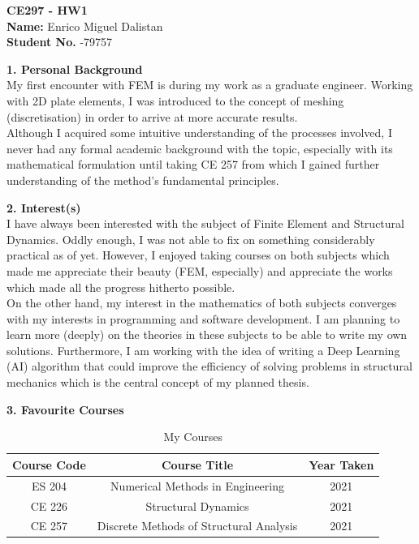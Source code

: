 \documentclass[12pt,a4paper]{article}
\begin{document}
\noindent \textbf{CE297 - HW1} \\
\textbf{Name:} \noindent Enrico Miguel Dalistan \\
\textbf{Student No.} -79757\\
\bigskip
\bigskip
\bigskip

\noindent \textbf{1. Personal Background} \\

\noindent My first encounter with FEM is during my work as a graduate engineer.
Working with 2D plate elements, I was introduced to the concept of meshing (discretisation)
in order to arrive at more accurate results. \\

\noindent Although I acquired some intuitive understanding of the processes involved, I never had any formal academic background with the topic, especially with its
mathematical formulation until taking CE 257 from which I gained further understanding of
the method's fundamental principles. \\
\bigskip

\noindent \textbf{2. Interest(s)}\\

\noindent I have always been interested with the subject of Finite Element and Structural Dynamics.
Oddly enough, I was not able to fix on something considerably practical as of yet. However, I enjoyed taking courses on
both subjects which made me appreciate their beauty (FEM, especially) and appreciate the works which made
all the progress hitherto possible.\\

\noindent On the other hand, my interest in the mathematics of both subjects converges with my interests
in programming and software development. I am planning to learn more (deeply) on the theories in these subjects
to be able to write my own solutions. Furthermore, I am working with the idea of writing a Deep Learning (AI)
algorithm that could improve the efficiency of solving problems in structural mechanics
which is the central concept of my planned thesis. \\
\bigskip

\noindent \textbf{3. Favourite Courses}
\begin{table} [htb]
  \begin{center}
    \caption{My Courses}
    {\begin{tabular} [t] {ccc}
        \hline
        \textbf{Course Code} & \textbf{Course Title}                   & \textbf{Year Taken} \\
        \hline
        ES 204               & Numerical Methods in Engineering        & 2021                \\
        CE 226               & Structural Dynamics                     & 2021                \\
        CE 257               & Discrete Methods of Structural Analysis & 2021                \\
      \end{tabular}}
  \end{center}
\end{table}
\end{document}
